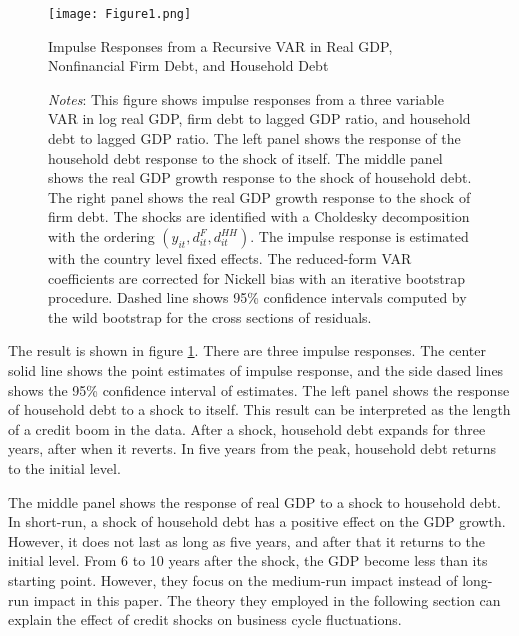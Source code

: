 \documentclass{ltjarticle}
\begin{document}
\begin{figure}[h]
    \begin{center}
        \texttt{[image: Figure1.png]}
        \caption{}{Impulse Responses from a Recursive VAR in Real GDP, Nonfinancial Firm Debt, and Household Debt}
        \label{fig1}
    \end{center}
    \begin{tablenotes}
        \small
        \item \textit{Notes}: This figure shows impulse responses from a three variable VAR in log real GDP, firm debt to lagged GDP ratio, and household debt to lagged GDP ratio. The left panel shows the response of the household debt response to the shock of itself. The middle panel shows the real GDP growth response to the shock of household debt. The right panel shows the real GDP growth response to the shock of firm debt. The shocks are identified with a Choldesky decomposition with the ordering $\left(y_{it}, d_{it}^{F}, d_{it}^{HH}\right) $. The impulse response is estimated with the country level fixed effects. The reduced-form VAR coefficients are corrected for Nickell bias with an iterative bootstrap procedure. Dashed line shows 95\% confidence intervals computed by the wild bootstrap for the cross sections of residuals.
    \end{tablenotes}
\end{figure}

The result is shown in figure \ref{fig1}. There are three impulse responses. The center solid line shows the point estimates of impulse response, and the side dased lines shows the 95\% confidence interval of estimates.  The left panel shows the response of household debt to a shock to itself. This result can be interpreted as the length of a credit boom in the data. After a shock, household debt expands for three years, after when it reverts. In five years from the peak, household debt returns to the initial level. 

The middle panel shows the response of real GDP to a shock to household debt. In short-run, a shock of household debt has a positive effect on the GDP growth. However, it does not last as long as five years, and after that it returns to the initial level. From 6 to 10 years after the shock, the GDP become less than its starting point. However, they focus on the medium-run impact instead of long-run impact in this paper. The theory they employed in the following section can explain the effect of credit shocks on business cycle fluctuations. 
\end{document}
